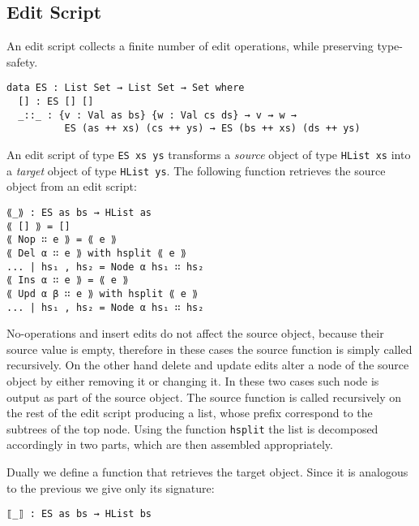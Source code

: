 \documentclass[preprint]{sigplanconf}
\begin{document}
	\subsection{Edit Script}
	An edit script collects a finite number of edit operations, 
	while preserving type-safety. 
\begin{verbatim}
data ES : List Set → List Set → Set where
  [] : ES [] []
  _::_ : {v : Val as bs} {w : Val cs ds} → v ⇝ w → 
          ES (as ++ xs) (cs ++ ys) → ES (bs ++ xs) (ds ++ ys)
\end{verbatim}	
	An edit script of type \texttt{ES xs ys} transforms
	a \emph{source} object of type \texttt{HList xs} into
	a \emph{target} object of type \texttt{HList ys}. 
	The following function retrieves the source object from an edit script:			
\begin{verbatim}
⟪_⟫ : ES as bs → HList as
⟪ [] ⟫ = []
⟪ Nop ∷ e ⟫ = ⟪ e ⟫
⟪ Del α ∷ e ⟫ with hsplit ⟪ e ⟫
... | hs₁ , hs₂ = Node α hs₁ ∷ hs₂
⟪ Ins α ∷ e ⟫ = ⟪ e ⟫
⟪ Upd α β ∷ e ⟫ with hsplit ⟪ e ⟫
... | hs₁ , hs₂ = Node α hs₁ ∷ hs₂
\end{verbatim}
	No-operations and insert edits do not affect the source object,
	because their source value is empty, therefore in these cases the source 
	function is simply called recursively.
	On the other hand delete and update edits alter a node of the
	source object by either removing it or changing it.
	In these two cases such node is output as part of the source object.
	The source function is called recursively on the rest of the edit 
	script producing a list, whose prefix correspond to the subtrees of the
	top node. Using the function \texttt{hsplit} the list is decomposed 
	accordingly in two parts, which are then assembled appropriately.
	
	Dually we define a function that retrieves the target object.
	Since it is analogous to the previous we give only its signature:
	
\begin{verbatim}
⟦_⟧ : ES as bs → HList bs
\end{verbatim}
\end{document}
